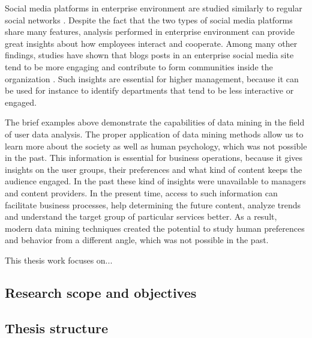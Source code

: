     Social media platforms in enterprise environment are studied similarly to regular social networks \cite{guy2016whatsyourorganizationlike}. Despite the fact that the two types of social media platforms share many features, analysis performed in enterprise environment can provide great insights about how employees interact and cooperate. Among many other findings, studies have shown that blogs posts in an enterprise social media site tend to be more engaging and contribute to form communities inside the organization \cite{guy2016whatsyourorganizationlike}. Such insights are essential for higher management, because it can be used for instance to identify departments that tend to be less interactive or engaged.


    The brief examples above demonstrate the capabilities of data mining in the field of user data analysis. The proper application of data mining methods allow us to learn more about the society as well as human psychology, which was not possible in the past. This information is essential for business operations, because it gives insights on the user groups, their preferences and what kind of content keeps the audience engaged. In the past these kind of insights were unavailable to managers and content providers. In the present time, access to such information can facilitate business processes, help determining the future content, analyze trends and understand the target group of particular services better. As a result, modern data mining techniques created the potential to study human preferences and behavior from a different angle, which was not possible in the past. 

    This thesis work focuses on...


\subsection{Research scope and objectives}


\subsection{Thesis structure}

